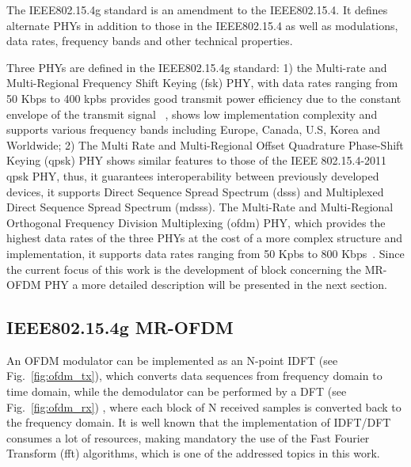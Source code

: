 The IEEE802.15.4g standard is an amendment to the
IEEE802.15.4. It defines alternate PHYs in addition to those in the IEEE802.15.4 as well as modulations,
 data rates, frequency bands and other technical properties. %

Three PHYs are defined in the IEEE802.15.4g standard:
1) the Multi-rate and 
Multi-Regional Frequency Shift Keying (\ac{fsk}) PHY, with data rates ranging from 50 Kbps to 400 kpbs provides good transmit power efficiency due to the constant envelope of the transmit signal ~\cite{sun_std_2012}, shows low implementation complexity and supports various frequency bands including Europe, Canada, U.S, Korea and Worldwide; 2) The Multi Rate and Multi-Regional Offset Quadrature Phase-Shift Keying  (\ac{qpsk})
PHY shows similar features to those of the IEEE 802.15.4-2011 \ac{qpsk} PHY, thus,  it guarantees interoperability between previously developed devices, it supports Direct Sequence Spread Spectrum (\ac{dsss}) and Multiplexed Direct Sequence Spread Spectrum (\ac{mdsss}). The Multi-Rate and Multi-Regional Orthogonal Frequency Division Multiplexing (\ac{ofdm}) PHY, which provides
 the highest data rates of the three PHYs at the cost of a more complex structure and implementation, it supports data rates ranging from 50 Kpbs to 800 Kbps~\cite{sun_std_2012}. Since the current focus of this work is the development of block concerning the MR-OFDM PHY a more detailed description will be presented in the next section. 
 
\subsection{IEEE802.15.4g MR-OFDM}
\label{sec:mr_ofdm}



An OFDM modulator can be implemented as an N-point IDFT (see Fig.~\ref{fig:ofdm_tx}), which converts data sequences from frequency domain to time domain, while the demodulator
can be performed by a DFT (see Fig.~\ref{fig:ofdm_rx}) , where each block of N 
received samples is converted back to the frequency domain.
It is well known that the implementation of IDFT/DFT consumes a lot of resources, making mandatory 
the use of the Fast Fourier Transform (\ac{fft}) algorithms, which is one of the addressed topics in this work. 


